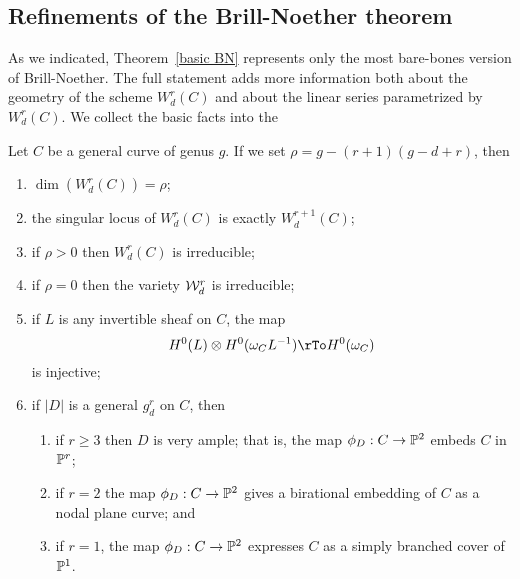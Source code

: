 \subsection{Refinements of the Brill-Noether theorem}

As we indicated, Theorem~\ref{basic BN} represents only the most bare-bones version of Brill-Noether. The full statement  adds more information both about the geometry of the scheme $W^r_d(C)$ and about the linear series parametrized by $W^r_d(C)$.  We collect the basic facts into the 

\begin{theorem}
Let $C$ be a general curve of genus $g$. If we set $\rho = g - (r+1)(g-d+r)$, then
\begin{enumerate}
\item $\dim(W^r_d(C)) = \rho$;
\item the singular locus of $W^r_d(C)$ is exactly $W^{r+1}_d(C)$;
\item if $\rho > 0$ then $W^r_d(C)$ is irreducible;
\item if $\rho = 0$ then the variety $\cW^r_d$ is irreducible;
\item if $L$ is any invertible sheaf on $C$, the map
$$
H^0(L) \otimes H^0(\omega_CL^{-1}) \rTo H^0(\omega_C)
$$
is injective;
\item if $|D|$ is a general $g^r_d$ on $C$, then
\begin{enumerate}
\item if $r \geq 3$ then $D$ is very ample; that is, the map $\phi_D : C \to \PP^2$   embeds $C$ in $\PP^r$;
\item if $r=2$ the map $\phi_D : C \to \PP^2$ gives a birational embedding of $C$ as a nodal plane curve; and 
\item if $r=1$, the map $\phi_D : C \to \PP^2$ expresses $C$ as a simply branched cover of $\PP^1$.
\end{enumerate}
\end{enumerate}
\end{theorem}



